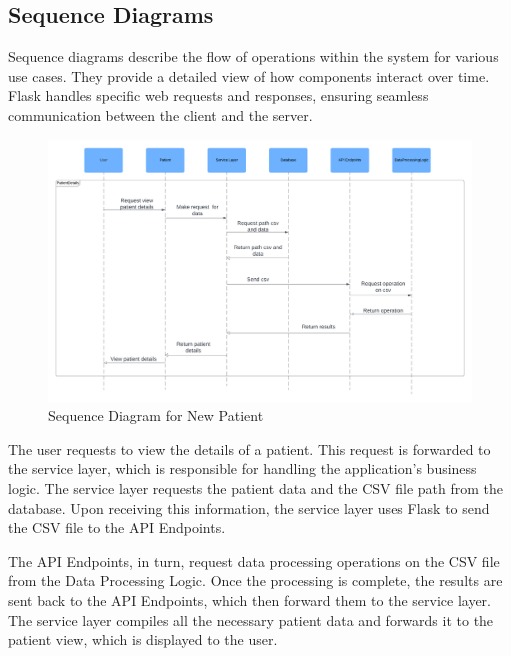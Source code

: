 \documentclass{article}
\begin{document}
\subsection{Sequence Diagrams}
Sequence diagrams describe the flow of operations within the system for various use cases. They provide a detailed view of how components interact over time. Flask handles specific web requests and responses, ensuring seamless communication between the client and the server.

\pagebreak

\begin{figure}[h]
\centering
\includegraphics[width=1.1\textwidth]{Images/Diagrams/sequence.png}
\caption{Sequence Diagram for New Patient}
\end{figure}

The user requests to view the details of a patient. This request is forwarded to the service layer, which is responsible for handling the application’s business logic. The service layer requests the patient data and the CSV file path from the database. Upon receiving this information, the service layer uses Flask to send the CSV file to the API Endpoints.

The API Endpoints, in turn, request data processing operations on the CSV file from the Data Processing Logic. Once the processing is complete, the results are sent back to the API Endpoints, which then forward them to the service layer. The service layer compiles all the necessary patient data and forwards it to the patient view, which is displayed to the user.
\end{document}
